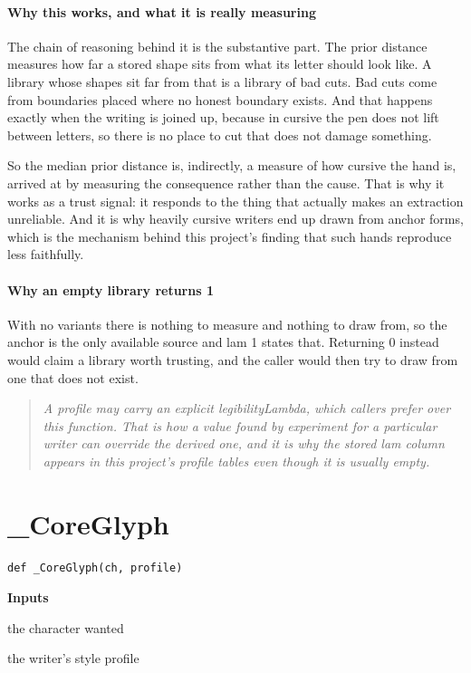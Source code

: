 \paragraph{Why this works, and what it is really measuring}
The chain of reasoning behind it is the substantive part. The prior distance measures how far a stored shape sits from what its letter should look like. A library whose shapes sit far from that is a library of bad cuts. Bad cuts come from boundaries placed where no honest boundary exists. And that happens exactly when the writing is joined up, because in cursive the pen does not lift between letters, so there is no place to cut that does not damage something.

So the median prior distance is, indirectly, a measure of how cursive the hand is, arrived at by measuring the consequence rather than the cause. That is why it works as a trust signal: it responds to the thing that actually makes an extraction unreliable. And it is why heavily cursive writers end up drawn from anchor forms, which is the mechanism behind this project's finding that such hands reproduce less faithfully.


\paragraph{Why an empty library returns 1}
With no variants there is nothing to measure and nothing to draw from, so the anchor is the only available source and lam 1 states that. Returning 0 instead would claim a library worth trusting, and the caller would then try to draw from one that does not exist.


\begin{quote}\small\itshape A profile may carry an explicit legibilityLambda, which callers prefer over this function. That is how a value found by experiment for a particular writer can override the derived one, and it is why the stored lam column appears in this project's profile tables even though it is usually empty.\end{quote}

\section{\_CoreGlyph}
\begin{lstlisting}[style=sig]
def _CoreGlyph(ch, profile)
\end{lstlisting}

\noindent\textbf{Inputs}
\begin{description}[leftmargin=2.2em,style=nextline,font=\normalfont\ttfamily]\setlength\itemsep{1pt}
  \item[{ch}] \normalfont the character wanted
  \item[{profile}] \normalfont the writer's style profile
\end{description}

